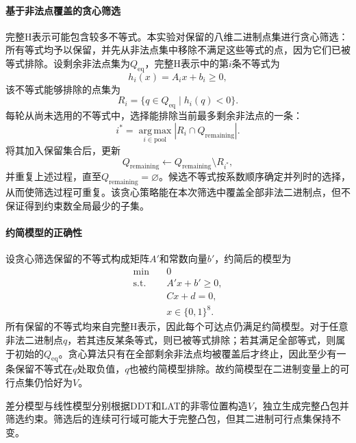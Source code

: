 \paragraph{基于非法点覆盖的贪心筛选}

完整H表示可能包含较多不等式。本实验对保留的八维二进制点集进行贪心筛选：所有等式均予以保留，并先从非法点集中移除不满足这些等式的点，因为它们已被等式排除。设剩余非法点集为$Q_{\mathrm{eq}}$，完整H表示中的第$i$条不等式为
\[
h_i(x)=A_i x+b_i\ge0,
\]
该不等式能够排除的点集为
\[
R_i=\{q\in Q_{\mathrm{eq}}\mid h_i(q)<0\}.
\]
每轮从尚未选用的不等式中，选择能排除当前最多剩余非法点的一条：
\[
i^*=\underset{i\in\mathrm{pool}}{\operatorname{arg\,max}}
\left|R_i\cap Q_{\mathrm{remaining}}\right|.
\]
将其加入保留集合后，更新
\[
Q_{\mathrm{remaining}}
\leftarrow Q_{\mathrm{remaining}}\setminus R_{i^*},
\]
并重复上述过程，直至$Q_{\mathrm{remaining}}=\varnothing$。候选不等式按系数顺序确定并列时的选择，从而使筛选过程可重复。该贪心策略能在本次筛选中覆盖全部非法二进制点，但不保证得到约束数全局最少的子集。

\paragraph{约简模型的正确性}

设贪心筛选保留的不等式构成矩阵$A'$和常数向量$b'$，约简后的模型为
\begin{equation}
\begin{aligned}
\min\quad &0\\
\text{s.t.}\quad
&A'x+b'\ge0,\\
&Cx+d=0,\\
&x\in\{0,1\}^{8}.
\end{aligned}
\label{eq:lab4-reduced-hull-model}
\end{equation}
所有保留的不等式均来自完整H表示，因此每个可达点仍满足约简模型。对于任意非法二进制点$q$，若其违反某条等式，则已被等式排除；若其满足全部等式，则属于初始的$Q_{\mathrm{eq}}$。贪心算法只有在全部剩余非法点均被覆盖后才终止，因此至少有一条保留不等式在$q$处取负值，$q$也被约简模型排除。故约简模型在二进制变量上的可行点集仍恰好为$V$。

差分模型与线性模型分别根据DDT和LAT的非零位置构造$V$，独立生成完整凸包并筛选约束。筛选后的连续可行域可能大于完整凸包，但其二进制可行点集保持不变。
